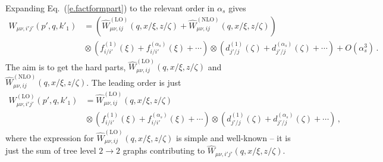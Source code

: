 \documentclass[prd,preprintnumbers,nofootinbib,superscriptaddress,onecolumn,preprint]{revtex4-1}
\newcommand\3[1]{\boldsymbol{#1}}
\newcommand{\eref}[1]{Eq.~(\ref{e.#1})}
\begin{document}
Expanding \eref{factformpart} to the relevant order in $\alpha_s$ gives
%
\begin{align}
W_{\mu \nu,i'j'}(p',q,k'_1)  
&{}= ( \hat{W}^{(\text{LO})}_{\mu \nu, ij}(q,x/\xi,z/\zeta) 
+ \hat{W}^{(\text{NLO})}_{\mu \nu, ij}(q,x/\xi,z/\zeta)) \nonumber \\    
&{} \otimes \left( f^{(1)}_{i/i'}(\xi) + f^{(\alpha_s)}_{i/i'}(\xi) + \cdots \right) 
\otimes \left( d^{(1)}_{j'/j}(\zeta) + d^{(\alpha_s)}_{j'/j}(\zeta) + \cdots \right) 
+ O(\alpha_s^3)\, . 
\label{e.expandW}
%
\end{align}
%
The aim is to get the hard parts, $\hat{W}^{(\text{LO})}_{\mu \nu,
	ij}(q,x/\xi,z/\zeta)$ and $\hat{W}^{(\text{NLO})}_{\mu \nu,
	ij}(q,x/\xi,z/\zeta)$. The leading order is just
%
\begin{align}
W^{(\text{LO})}_{\mu \nu,i'j'}(p',q,k'_1) 
&{}=  \hat{W}^{(\text{LO})}_{\mu \nu, ij}(q,x/\xi,z/\zeta) \nonumber \\
&{}   \otimes \left( f^{(1)}_{i/i'}(\xi) + f^{(\alpha_s)}_{i/i'}(\xi) + \cdots \right)
\otimes \left( d^{(1)}_{j'/j}(\zeta) + d^{(\alpha_s)}_{j'/j}(\zeta) + \cdots \right) \, ,
\label{e.expandWlead}
\end{align}
%
where the expression for 
$\hat{W}^{(\text{LO})}_{\mu \nu,ij}(q,x/\xi,z/\zeta)$ 
is simple and well-known -- it is just the sum
of tree level $2 \to 2$ graphs contributing to 
$\hat{W}_{\mu\nu,i'j'}(q,x/\xi,z/\zeta)$. 
\end{document}

